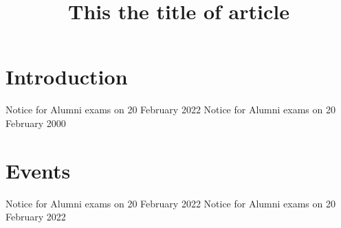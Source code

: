 \documentclass{article}
\begin{document}
	\title{This the title of article}
	\maketitle
	\section{Introduction}
		Notice for Alumni exams on 20 February 2022
		Notice for Alumni exams on 20 February 2000
	\section{Events}
			Notice for Alumni exams on 20 February 2022
			Notice for Alumni exams on 20 February 2022
\end{document}
